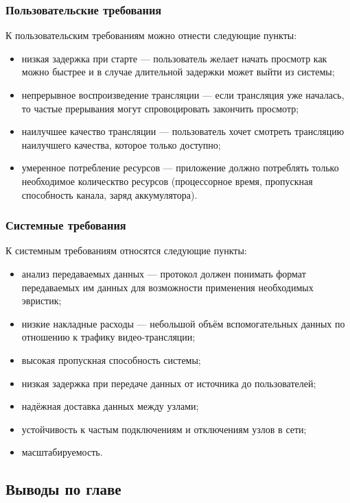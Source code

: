 		\subsubsection{Пользовательские требования}
		К пользовательским требованиям можно отнести следующие пункты:
		\begin{itemize}
			\item низкая задержка при старте --- пользователь желает начать просмотр как можно быстрее и в случае
			длительной задержки может выйти из системы;
			\item непрерывное воспроизведение трансляции --- если трансляция уже началась, то частые прерывания могут
			спровоцировать закончить просмотр;
			\item наилучшее качество трансляции --- пользователь хочет смотреть трансляцию наилучшего качества, которое
			только доступно;
			\item умеренное потребление ресурсов --- приложение должно потреблять только необходимое колическтво
			ресурсов (процессорное время, пропускная способность канала, заряд аккумулятора).
		\end{itemize}

		\subsubsection{Системные требования}
		К системным требованиям относятся следующие пункты:
		\begin{itemize}
			\item анализ передаваемых данных --- протокол должен понимать формат передаваемых им данных для возможности
			применения необходимых эвристик;
			\item низкие накладные расходы --- небольшой объём вспомогательных данных по отношению к трафику
			видео-трансляции;
			\item высокая пропускная способность системы;
			\item низкая задержка при передаче данных от источника до пользователей;
			\item надёжная доставка данных между узлами;
			\item устойчивость к частым подключениям и отключениям узлов в сети;
			\item масштабируемость.
		\end{itemize}

	\subsection{Выводы по главе}

